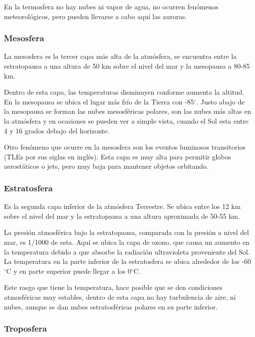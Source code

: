\documentclass{article}
\begin{document}
En la termosfera no hay nubes ni vapor de agua, no ocurren fenómenos meteorológicos, pero pueden llevarse a cabo aquí las auroras. 


\subsubsection {Mesosfera}

La mesosfera es la tercer capa más alta de la atmósfera, se encuentra entre la estratopausa a una altura de 50 km sobre el nivel del mar y la mesopausa a 80-85 km. 

Dentro de esta capa, las temperaturas disminuyen conforme aumenta la altitud. En la mesopausa se ubica el lugar más frío de la Tierra con -85$^\circ$. Justo abajo de la mesopausa se forman las nubes mesosféricas polares, son las nubes más altas en la atmósfera y en ocasiones se pueden ver a simple vista, cuando el Sol esta entre 4 y 16 grados debajo del horizonte.

Otro fenómeno que ocurre en la mesosfera son los eventos luminosos transitorios (TLEs por sus siglas en inglés). Esta capa es muy alta para permitir globos aerostáticos o jets, pero muy baja para mantener objetos orbitando. 


\subsubsection {Estratosfera}

Es la segunda capa inferior de la atmósfera Terrestre. Se ubica entre los 12 km sobre el nivel del mar y la estratopausa a una altura aproximada de 50-55 km. 

La presión atmosférica bajo la estratopausa, comparada con la presión a nivel del mar, es 1/1000 de esta. Aquí se ubica la capa de ozono, que causa un aumento en la temperatura debido a que absorbe la radiación ultravioleta proveniente del Sol. La temperatura en la parte inferior de la estratosfera se ubica alrededor de los -60$^\circ$C y en parte superior puede llegar a los 0$^\circ$C.

Este rasgo que tiene la temperatura, hace posible que se den condiciones atmosféricas muy estables, dentro de esta capa no hay turbulencia de aire, ni nubes, aunque se dan nubes estratosféricas polares en su parte inferior. 


\subsubsection {Troposfera}
\end{document}
